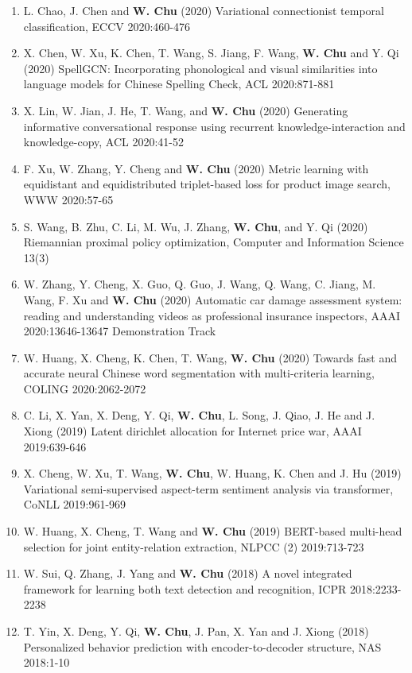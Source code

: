 \documentclass[line,10pt,final]{res}
\begin{document}
\begin{resume}
\begin{enumerate}
\item L. Chao, J. Chen and  {\bf W. Chu} (2020) Variational connectionist temporal classification, ECCV 2020:460-476  
\item X. Chen, W. Xu, K. Chen, T. Wang, S. Jiang, F. Wang,  {\bf W. Chu} and Y. Qi (2020) SpellGCN: Incorporating phonological and visual similarities into language models for Chinese Spelling Check, ACL 2020:871-881  
\item X. Lin, W. Jian, J. He, T. Wang, and  {\bf W. Chu} (2020) Generating informative conversational response using recurrent knowledge-interaction and knowledge-copy, ACL 2020:41-52  
\item F. Xu, W. Zhang, Y. Cheng and  {\bf W. Chu} (2020) Metric learning with equidistant and equidistributed triplet-based loss for product image search, WWW 2020:57-65  
\item S. Wang, B. Zhu, C. Li, M. Wu, J. Zhang,  {\bf W. Chu}, and Y. Qi (2020) Riemannian proximal policy optimization, Computer and Information Science 13(3)  
\item W. Zhang, Y. Cheng, X. Guo, Q. Guo, J. Wang, Q. Wang, C. Jiang, M. Wang, F. Xu and  {\bf W. Chu} (2020) Automatic car damage assessment system: reading and understanding videos as professional insurance inspectors, AAAI 2020:13646-13647 Demonstration Track  
\item W. Huang, X. Cheng, K. Chen, T. Wang,  {\bf W. Chu} (2020) Towards fast and accurate neural Chinese word segmentation with multi-criteria learning, COLING 2020:2062-2072  
\item C. Li, X. Yan, X. Deng, Y. Qi,  {\bf W. Chu}, L. Song, J. Qiao, J. He and J. Xiong (2019) Latent dirichlet allocation for Internet price war, AAAI 2019:639-646  
\item X. Cheng, W. Xu, T. Wang,  {\bf W. Chu}, W. Huang, K. Chen and J. Hu (2019) Variational semi-supervised aspect-term sentiment analysis via transformer, CoNLL 2019:961-969  
\item W. Huang, X. Cheng, T. Wang and  {\bf W. Chu} (2019) BERT-based multi-head selection for joint entity-relation extraction, NLPCC (2) 2019:713-723  
\item W. Sui, Q. Zhang, J. Yang and  {\bf W. Chu} (2018) A novel integrated framework for learning both text detection and recognition, ICPR 2018:2233-2238  
\item T. Yin, X. Deng, Y. Qi,  {\bf W. Chu}, J. Pan, X. Yan and J. Xiong (2018) Personalized behavior prediction with encoder-to-decoder structure, NAS 2018:1-10  

\end{enumerate}
\end{resume}
\end{document}
